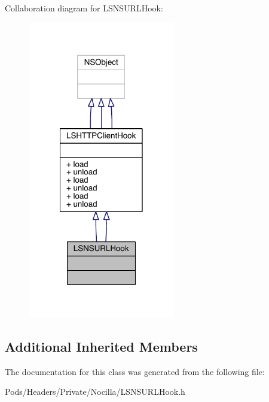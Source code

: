 Collaboration diagram for L\-S\-N\-S\-U\-R\-L\-Hook\-:\nopagebreak
\begin{figure}[H]
\begin{center}
\leavevmode
\includegraphics[width=182pt]{interface_l_s_n_s_u_r_l_hook__coll__graph}
\end{center}
\end{figure}
\subsection*{Additional Inherited Members}


The documentation for this class was generated from the following file\-:\begin{DoxyCompactItemize}
\item 
Pods/\-Headers/\-Private/\-Nocilla/L\-S\-N\-S\-U\-R\-L\-Hook.\-h\end{DoxyCompactItemize}
